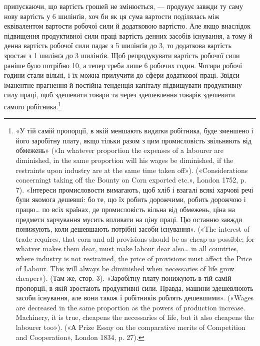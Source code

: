 \parcont{}  %
припускаючи, що вартість грошей не змінюється, — продукує
завжди ту саму нову вартість у 6 шилінґів, хоч би як ця сума
вартости поділялась між еквівалентом вартости робочої сили й
додатковою вартістю. Але якщо внаслідок підвищення продуктивної сили праці
вартість денних засобів існування, а тому й
денна вартість робочої сили падає з 5 шилінґів до 3, то додаткова
вартість зростає з 1 шилінґа до 3 шилінґів. Щоб репродукувати
вартість робочої сили раніше було потрібно 10, а тепер треба
лише 6 робочих годин. Чотири робочі години стали вільні, і їх
можна прилучити до сфери додаткової праці. Звідси іманентне
прагнення й постійна тенденція капіталу підвищувати продуктивну
силу праці, щоб здешевити товари та через здешевлення товарів
здешевити самого робітника.\footnote{
«У тій самій пропорції, в якій меншають видатки робітника, буде
зменшено і його заробітну плату, якщо тільки разом з цим промисловість
звільняють від обмежень» («In whatever proportion the expenses of a
labourer are diminished, in the same proportion will his wages be diminished,
if the restraints upon industry are at the same time taken off»).
(«Considerations concerningt taking off the Bounty on Corn exported etc.»,
London 1752, p. 7). «Інтереси промисловости вимагають, щоб хліб і
взагалі всякі харчові речі були якомога дешевші: бо те, що їх робить
дорожчими, робить дорожчою і працю\dots{} по всіх країнах, де промисловість
вільна від обмежень, ціна на предмети харчування мусить впливати
на ціну праці. Цю останню завжди понижують, коли дешевшають потрібні
засоби існування». («The interest of trade requires, that corn and all
provisions should be as cheap as possible; for whatver makes them dear, must
make labour dear also\dots{} in all countries, where industry is not restrained,
the price of provisions must affect the Price of Labour. This will always
be diminished when necessaries of life grow cheaper»). (Там же, стор. 3).
«Заробітну плату понижують в тій самій пропорції, в якій зростають
продуктивні сили. Правда, машини здешевлюють засоби існування, але
вони також і робітників роблять дешевшими». («Wages are decreased
in the same proportion as the powers of production increase. Machinery,
it is true, cheapens the necessaries of life, but it also cheapens the labourer
too»). («А Prize Essay on the comparative merits of Competition and
Cooperation», London 1834, p. 27).
}

